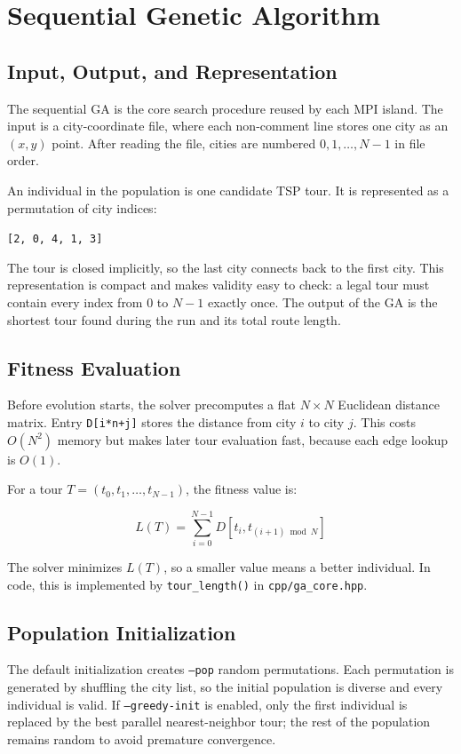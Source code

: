 \documentclass[11pt,a4paper]{article}
\begin{document}
\newpage
\section{Sequential Genetic Algorithm}

\subsection{Input, Output, and Representation}
The sequential GA is the core search procedure reused by each MPI island. The
input is a city-coordinate file, where each non-comment line stores one city as
an $(x,y)$ point. After reading the file, cities are numbered
$0,1,\ldots,N-1$ in file order.

An individual in the population is one candidate TSP tour. It is represented as
a permutation of city indices:

\begin{center}
\texttt{[2, 0, 4, 1, 3]}
\end{center}

The tour is closed implicitly, so the last city connects back to the first city.
This representation is compact and makes validity easy to check: a legal tour
must contain every index from $0$ to $N-1$ exactly once. The output of the GA is
the shortest tour found during the run and its total route length.

\subsection{Fitness Evaluation}
Before evolution starts, the solver precomputes a flat $N \times N$ Euclidean
distance matrix. Entry \texttt{D[i*n+j]} stores the distance from city $i$ to
city $j$. This costs $O(N^2)$ memory but makes later tour evaluation fast,
because each edge lookup is $O(1)$.

For a tour $T=(t_0,t_1,\ldots,t_{N-1})$, the fitness value is:

\[
  L(T)=\sum_{i=0}^{N-1} D[t_i,t_{(i+1)\bmod N}]
\]

The solver minimizes $L(T)$, so a smaller value means a better individual. In
code, this is implemented by \texttt{tour\_length()} in
\texttt{cpp/ga\_core.hpp}.

\subsection{Population Initialization}
The default initialization creates \texttt{--pop} random permutations. Each
permutation is generated by shuffling the city list, so the initial population
is diverse and every individual is valid. If \texttt{--greedy-init} is enabled,
only the first individual is replaced by the best parallel nearest-neighbor
tour; the rest of the population remains random to avoid premature convergence.
\end{document}
